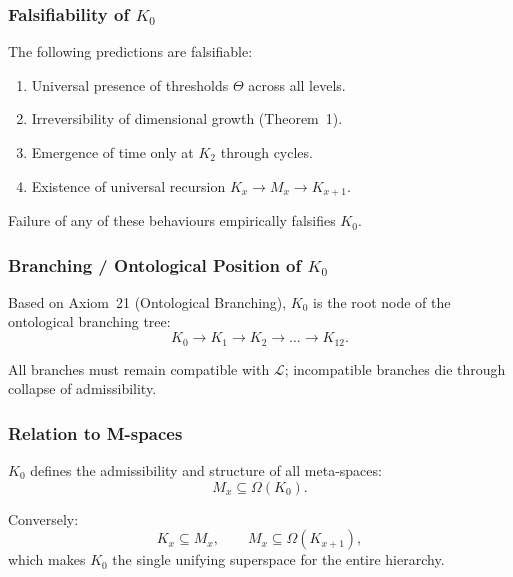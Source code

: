 \subsubsection{Falsifiability of \texorpdfstring{$K_0$}{K_0}}

The following predictions are falsifiable:
\begin{enumerate}
    \item Universal presence of thresholds $\Theta$ across all levels.
    \item Irreversibility of dimensional growth (Theorem~1).
    \item Emergence of time only at $K_2$ through cycles.
    \item Existence of universal recursion $K_x\to M_x\to K_{x+1}$.
\end{enumerate}

Failure of any of these behaviours empirically falsifies $K_0$.

\subsubsection{Branching / Ontological Position of \texorpdfstring{$K_0$}{K_0}}

Based on Axiom~21 (Ontological Branching), $K_0$ is the root node of the
ontological branching tree:
\[
K_0 \rightarrow K_1 \rightarrow K_2 \rightarrow \dots \rightarrow K_{12}.
\]

All branches must remain compatible with $\mathcal{L}$; incompatible
branches die through collapse of admissibility.

\subsubsection{Relation to M-spaces}

$K_0$ defines the admissibility and structure of all meta-spaces:
\[
M_x \subseteq \Omega(K_0).
\]

Conversely:
\[
K_x \subseteq M_x,
\qquad
M_x \subseteq \Omega(K_{x+1}),
\]
which makes $K_0$ the single unifying superspace for the entire
hierarchy.
